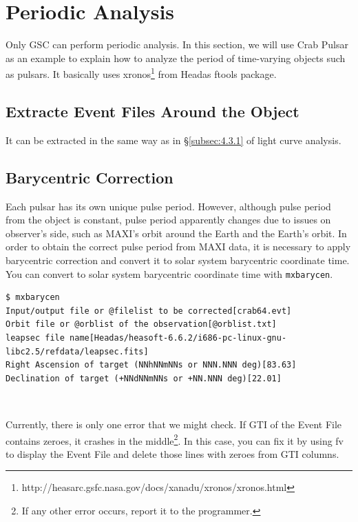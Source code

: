 \documentclass[10pt]{report}
\renewcommand{\_}{\textscale{.5}{\textbf{\textunderscore}}}
\begin{document}
\section{Periodic Analysis}\label{sec:4.5}

Only GSC can perform periodic analysis. In this section, we will use Crab Pulsar as an example to explain how to analyze the period of time-varying objects such as pulsars. It basically uses xronos\footnote{http://heasarc.gsfc.nasa.gov/docs/xanadu/xronos/xronos.html} from Headas ftools package. \\

\subsection{Extracte Event Files Around the Object}\label{subsec:4.5.1}

It can be extracted in the same way as in \S\ref{subsec:4.3.1} of light curve analysis. \\

\subsection{Barycentric Correction}\label{subsec:4.5.2}

Each pulsar has its own unique pulse period. However, although pulse period from the object is constant, pulse period apparently changes due to issues on observer's side, such as MAXI's orbit around the Earth and the Earth's orbit. In order to obtain the correct pulse period from MAXI data, it is necessary to apply barycentric correction and convert it to solar system barycentric coordinate time. You can convert to solar system barycentric coordinate time with \texttt{mxbarycen}. \\

\begin{lstlisting}
$ mxbarycen
Input/output file or @filelist to be corrected[crab64.evt]
Orbit file or @orblist of the observation[@orblist.txt]
leapsec file name[Headas/heasoft-6.6.2/i686-pc-linux-gnu-libc2.5/refdata/leapsec.fits]
Right Ascension of target (NNhNNmNNs or NNN.NNN deg)[83.63]
Declination of target (+NNdNNmNNs or +NN.NNN deg)[22.01]
\end{lstlisting}

\

Currently, there is only one error that we might check. If GTI of the Event File contains zeroes, it crashes in the middle\footnote{If any other error occurs, report it to the programmer.}. In this case, you can fix it by using fv to display the Event File and delete those lines with zeroes from GTI columns. \\
\end{document}
